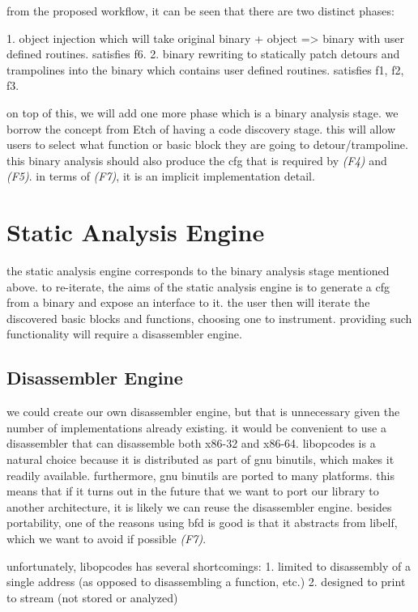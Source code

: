 from the proposed workflow, it can be seen that there are two distinct phases:

1. object injection which will take original binary + object => binary with user defined routines. satisfies f6.
2. binary rewriting to statically patch detours and trampolines into the binary which contains user defined routines. satisfies f1, f2, f3.

on top of this, we will add one more phase which is a binary analysis stage. we borrow the concept from Etch of having a code discovery stage. this will allow users to select what function or basic block they are going to detour/trampoline. this binary analysis should also produce the cfg that is required by \emph{(F4)} and \emph{(F5)}. in terms of \emph{(F7)}, it is an implicit implementation detail.

\section{Static Analysis Engine}

the static analysis engine corresponds to the binary analysis stage mentioned above. to re-iterate, the aims of the static analysis engine is to generate a cfg from a binary and expose an interface to it. the user then will iterate the discovered basic blocks and functions, choosing one to instrument. providing such functionality will require a disassembler engine.

\subsection{Disassembler Engine}

we could create our own disassembler engine, but that is unnecessary given the number of implementations already existing. it would be convenient to use a disassembler that can disassemble both x86-32 and x86-64. libopcodes is a natural choice because it is distributed as part of gnu binutils, which makes it readily available. furthermore, gnu binutils are ported to many platforms. this means that if it turns out in the future that we want to port our library to another architecture, it is likely we can reuse the disassembler engine. besides portability, one of the reasons using bfd is good is that it abstracts from libelf, which we want to avoid if possible \emph{(F7)}.

unfortunately, libopcodes has several shortcomings:
1. limited to disassembly of a single address (as opposed to disassembling a function, etc.)
2. designed to print to stream (not stored or analyzed)

